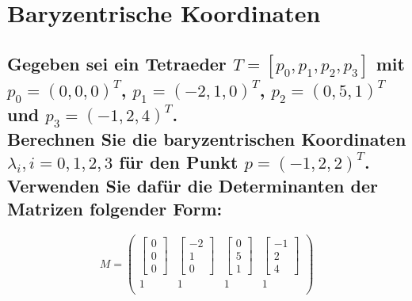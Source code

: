 \documentclass[a4paper,10pt,DIV=14]{article}
\begin{document}
\section{Baryzentrische Koordinaten}

\subsection{Gegeben sei ein Tetraeder $T = [p_0, p_1, p_2, p_3]$ mit $p_0 = (0, 0, 0)^T$, $p_1 = (-2, 1, 0)^T$, $p_2 = (0, 5, 1)^T$ und $p_3 = (-1, 2, 4)^T$. \vspace{.5em} \\  Berechnen Sie die baryzentrischen Koordinaten $\lambda_i, i = 0, 1, 2, 3$ für den Punkt $p = (-1, 2, 2)^T$. Verwenden Sie dafür die Determinanten der Matrizen folgender Form:}
	$$M = \begin{pmatrix}
	\begin{bmatrix}0\\0\\0\end{bmatrix} & \begin{bmatrix}-2\\1\\0\end{bmatrix} & \begin{bmatrix}0\\5\\1\end{bmatrix} & \begin{bmatrix}-1\\2\\4\end{bmatrix} \\
	1   & 1   & 1   & 1   \\
	\end{pmatrix}$$
\end{document}
